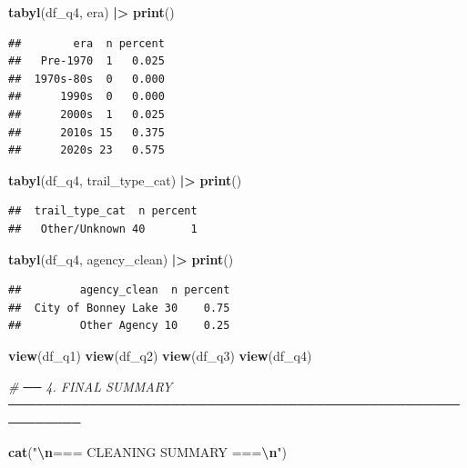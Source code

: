 \documentclass[
]{article}
\newenvironment{Shaded}{\begin{snugshade}}{\end{snugshade}}
\newcommand{\CommentTok}[1]{\textcolor[rgb]{0.56,0.35,0.01}{\textit{#1}}}
\newcommand{\FunctionTok}[1]{\textcolor[rgb]{0.13,0.29,0.53}{\textbf{#1}}}
\newcommand{\NormalTok}[1]{#1}
\newcommand{\SpecialCharTok}[1]{\textcolor[rgb]{0.81,0.36,0.00}{\textbf{#1}}}
\newcommand{\StringTok}[1]{\textcolor[rgb]{0.31,0.60,0.02}{#1}}
\begin{document}
\begin{Shaded}
\begin{Highlighting}[]
\FunctionTok{tabyl}\NormalTok{(df\_q4, era)            }\SpecialCharTok{|\textgreater{}} \FunctionTok{print}\NormalTok{()}
\end{Highlighting}
\end{Shaded}

\begin{verbatim}
##        era  n percent
##   Pre-1970  1   0.025
##  1970s-80s  0   0.000
##      1990s  0   0.000
##      2000s  1   0.025
##      2010s 15   0.375
##      2020s 23   0.575
\end{verbatim}

\begin{Shaded}
\begin{Highlighting}[]
\FunctionTok{tabyl}\NormalTok{(df\_q4, trail\_type\_cat) }\SpecialCharTok{|\textgreater{}} \FunctionTok{print}\NormalTok{()}
\end{Highlighting}
\end{Shaded}

\begin{verbatim}
##  trail_type_cat  n percent
##   Other/Unknown 40       1
\end{verbatim}

\begin{Shaded}
\begin{Highlighting}[]
\FunctionTok{tabyl}\NormalTok{(df\_q4, agency\_clean)   }\SpecialCharTok{|\textgreater{}} \FunctionTok{print}\NormalTok{()}
\end{Highlighting}
\end{Shaded}

\begin{verbatim}
##         agency_clean  n percent
##  City of Bonney Lake 30    0.75
##         Other Agency 10    0.25
\end{verbatim}

\begin{Shaded}
\begin{Highlighting}[]
\FunctionTok{view}\NormalTok{(df\_q1)}
\FunctionTok{view}\NormalTok{(df\_q2)}
\FunctionTok{view}\NormalTok{(df\_q3)}
\FunctionTok{view}\NormalTok{(df\_q4)}
\end{Highlighting}
\end{Shaded}

\begin{Shaded}
\begin{Highlighting}[]
\CommentTok{\# ── 4. FINAL SUMMARY ──────────────────────────────────────────────────────────}

\FunctionTok{cat}\NormalTok{(}\StringTok{"}\SpecialCharTok{\textbackslash{}n}\StringTok{=== CLEANING SUMMARY ===}\SpecialCharTok{\textbackslash{}n}\StringTok{"}\NormalTok{)}
\end{Highlighting}
\end{Shaded}
\end{document}
